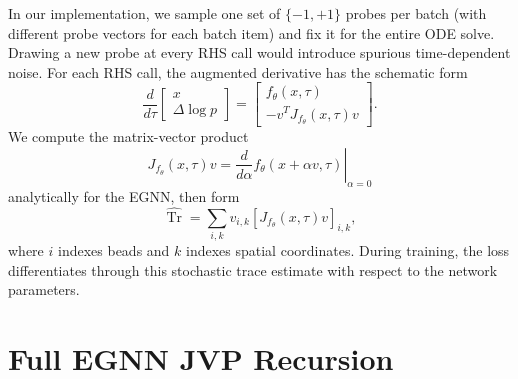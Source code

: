 \documentclass[reprint,amsmath,amssymb,aps,pra,10pt]{revtex4-2}
\begin{document}
In our implementation, we sample one set of $\{-1,+1\}$ probes per batch (with different probe vectors for each batch item) and fix it for the entire ODE solve.
Drawing a new probe at every RHS call would introduce spurious time-dependent noise.
For each RHS call, the augmented derivative has the schematic form
\begin{equation}
    \frac{d}{d\tau}
    \begin{bmatrix}
        x \\
        \Delta\log p
    \end{bmatrix}
    =
    \begin{bmatrix}
        f_\theta(x,\tau) \\
        -
        v^T J_{f_\theta}(x,\tau)v
    \end{bmatrix}.
\end{equation}
We compute the matrix-vector product
\begin{equation}
    J_{f_\theta}(x,\tau)v
    =
    \left.
    \frac{d}{d\alpha}
    f_\theta(x+\alpha v,\tau)
    \right|_{\alpha=0}
\end{equation}
analytically for the EGNN, then form
\begin{equation}
    \widehat{\operatorname{Tr}}
    =
    \sum_{i,k}
    v_{i,k}
    \left[
        J_{f_\theta}(x,\tau)v
    \right]_{i,k},
\end{equation}
where $i$ indexes beads and $k$ indexes spatial coordinates.
During training, the loss differentiates through this stochastic trace estimate with respect to the network parameters.

\section{Full EGNN JVP Recursion}
\end{document}
